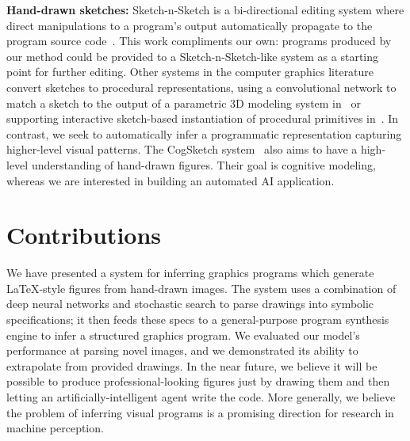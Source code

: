 \documentclass{article}
\theoremstyle{definition}
\begin{document}


\textbf{Hand-drawn sketches:} Sketch-n-Sketch is a bi-directional editing system where direct manipulations to a program's output automatically propagate to the program source code~\citep{Hempel:2016:SSP:2984511.2984575}. This work  compliments our own: programs produced by our method could be provided to a Sketch-n-Sketch-like system as a starting point for further editing.
Other systems in the computer graphics literature convert sketches to procedural representations, using a convolutional network to match a sketch to the output of a parametric 3D modeling system in~\citep{huang2017shape} or supporting interactive sketch-based instantiation of procedural primitives in~\citep{Nishida:2016:ISU:2897824.2925951}. In contrast, we seek to automatically infer a programmatic representation capturing higher-level visual patterns.
The CogSketch system~\citep{forbus2011cogsketch} also aims to have a high-level understanding of hand-drawn figures. Their  goal is cognitive modeling, whereas we are interested in building an automated AI application.%

\section{Contributions}

We have presented a system for inferring graphics programs which generate \LaTeX-style figures from hand-drawn images. The system uses a combination of deep neural networks and stochastic search to parse drawings into symbolic specifications; it then feeds these specs to a general-purpose program synthesis engine to infer a structured graphics program. We evaluated our model's performance at parsing novel images, and we demonstrated its ability to extrapolate from provided drawings.
In the near future, we believe it will be possible to produce professional-looking figures just by drawing them and then letting an artificially-intelligent agent write the code.
More generally, we believe the problem of inferring visual programs is a promising direction for research in machine perception.
\end{document}
